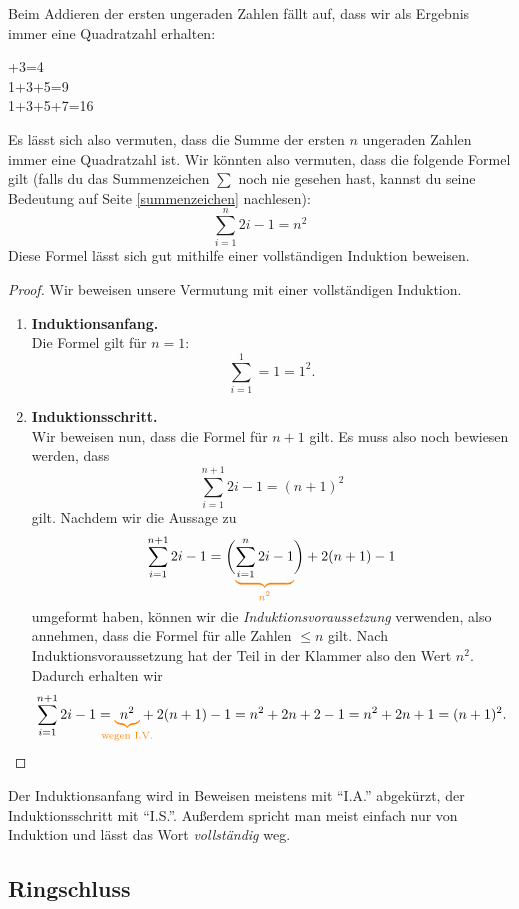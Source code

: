 \documentclass[../../main.tex]{subfiles}
\begin{document}
    \begin{example}{}
        Beim Addieren der ersten ungeraden Zahlen fällt auf, dass wir als Ergebnis immer eine Quadratzahl erhalten:
        \begin{multicols}{3}+3=4\\
            1+3+5=9\\
            1+3+5+7=16
        \end{multicols}
        Es lässt sich also vermuten, dass die Summe der ersten $n$ ungeraden Zahlen immer eine Quadratzahl ist. Wir könnten also vermuten, dass die folgende Formel gilt (falls du das Summenzeichen $\sum$ noch nie gesehen hast, kannst du seine Bedeutung auf Seite \ref{summenzeichen} nachlesen):
        \[\sum_{i=1}^n2i-1=n^2\]
        Diese Formel lässt sich gut mithilfe einer vollständigen Induktion beweisen.
        \begin{proof}
        Wir beweisen unsere Vermutung mit einer vollständigen Induktion.
        \begin{enumerate}
            \item \textbf{Induktionsanfang.}\\
                Die Formel gilt für $n=1$:
                \[\sum_{i=1}^1=1=1^2.\]
            \item \textbf{Induktionsschritt.}\\
                Wir beweisen nun, dass die Formel für $n+1$ gilt. Es muss also noch bewiesen werden, dass
                \[\sum_{i=1}^{n+1}2i-1=(n+1)^2\]
                gilt. Nachdem wir die Aussage zu
                \[\sum_{i=1}^{n+1}2i-1=\biggl(\colorbrace{\sum_{i=1}^n2i-1}{n^2}\biggr)+2(n+1)-1\]
                umgeformt haben, können wir die \emph{Induktionsvoraussetzung} verwenden, also annehmen, dass die Formel für alle Zahlen $\leq n$ gilt. Nach Induktionsvoraussetzung hat der Teil in der Klammer also den Wert $n^2$. Dadurch erhalten wir
                \[\sum_{i=1}^{n+1}2i-1=\colorbrace{n^2}{\text{wegen~I.V.}}+2(n+1)-1=n^2+2n+2-1=n^2+2n+1=(n+1)^2.\]
        \end{enumerate}
        \end{proof}
    \end{example}
    Der Induktionsanfang wird in Beweisen meistens mit \enquote{I.A.} abgekürzt, der Induktionsschritt mit \enquote{I.S.}. Außerdem spricht man meist einfach nur von Induktion und lässt das Wort \emph{vollständig} weg.
    
    \subsection{Ringschluss}
\end{document}
